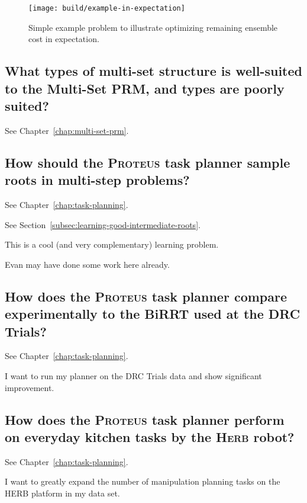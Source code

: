 {\begin{figure}
   \begin{center}
   \texttt{[image: build/example-in-expectation]}
   \end{center}
   \caption{Simple example problem to illustrate optimizing
      remaining ensemble cost in expectation.}
   \label{fig:example-in-expectation}
\end{figure}

\subsection{What types of multi-set structure is well-suited to
   the Multi-Set PRM, and types are poorly suited?}
\label{ques:multi-set-suited}

See Chapter~\ref{chap:multi-set-prm}.

\subsection{How should the \textsc{Proteus} task planner
   sample roots in multi-step problems?}
\label{ques:how-sequence}

See Chapter~\ref{chap:task-planning}.

See Section~\ref{subsec:learning-good-intermediate-roots}.

This is a cool (and very complementary) learning problem.

Evan may have done some work here already.

\subsection{How does the \textsc{Proteus} task planner
   compare experimentally to the BiRRT used at the DRC Trials?}
\label{ques:drc-compare}

See Chapter~\ref{chap:task-planning}.

I want to run my planner on the DRC Trials data
and show significant improvement.


\subsection{How does the \textsc{Proteus} task planner
   perform on everyday kitchen tasks by the \textsc{Herb} robot?}
\label{ques:herb-performance}

See Chapter~\ref{chap:task-planning}.

I want to greatly expand the number of manipulation planning tasks
on the HERB platform in my data set.

}%

